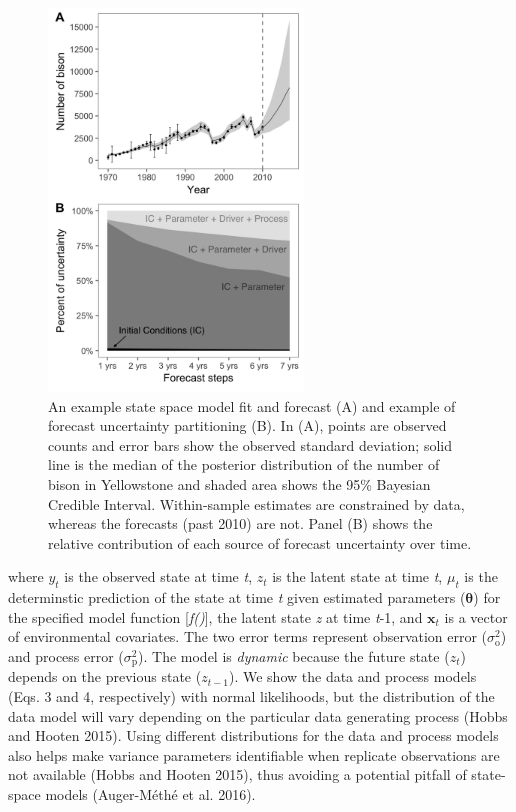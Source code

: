 \documentclass[12pt,]{article}
\begin{document}
\begin{figure}
  \centering
     \includegraphics[height=4in]{../figures/bison_combined.png}
  \caption{An example state space model fit and forecast (A) and example of forecast uncertainty partitioning (B). In (A), points are observed counts and error bars show the observed standard deviation; solid line is the median of the posterior distribution of the number of bison in Yellowstone and shaded area shows the 95\% Bayesian Credible Interval. Within-sample estimates are constrained by data, whereas the forecasts (past 2010) are not. Panel (B) shows the relative contribution of each source of forecast uncertainty over time.}
\end{figure}

where \(y_t\) is the observed state at time \emph{t}, \(z_t\) is the
latent state at time \emph{t}, \(\mu_t\) is the determinstic prediction
of the state at time \emph{t} given estimated parameters
(\(\boldsymbol{\theta}\)) for the specified model function
{[}\emph{f()}{]}, the latent state \emph{z} at time \emph{t}-1, and
\(\textbf{x}_t\) is a vector of environmental covariates. The two error
terms represent observation error (\(\sigma^2_{\text{o}}\)) and process
error (\(\sigma^2_{\text{p}}\)). The model is \emph{dynamic} because the
future state (\(z_t\)) depends on the previous state (\(z_{t-1}\)). We
show the data and process models (Eqs. 3 and 4, respectively) with
normal likelihoods, but the distribution of the data model will vary
depending on the particular data generating process (Hobbs and Hooten
2015). Using different distributions for the data and process models
also helps make variance parameters identifiable when replicate
observations are not available (Hobbs and Hooten 2015), thus avoiding a
potential pitfall of state-space models (Auger-Méthé et al. 2016).
\end{document}
